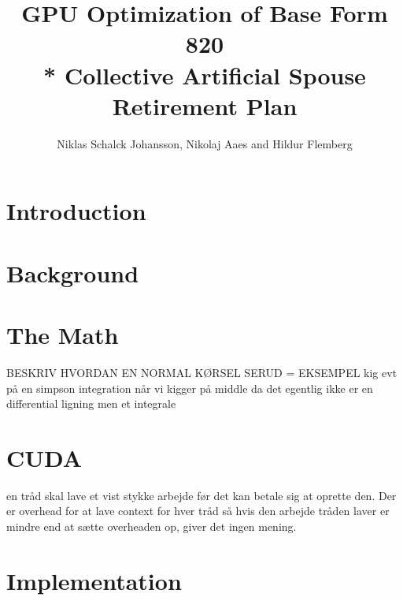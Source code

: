 \documentclass[oribibl]{llncs}
\title{GPU Optimization of Base Form 820 \\* Collective Artificial Spouse Retirement Plan}
\author{Niklas Schalck Johansson, Nikolaj Aaes and Hildur Flemberg\\
\email{\{nsjo, niaa, hufl\}@itu.dk}}
\institute{IT University of Copenhagen}
\begin{document}
	\maketitle
	
	
	\begin{abstract}
		
		\label{abstract}
	\end{abstract}
	
	\section{Introduction}
	
	
	\label{introduction}
		
	\section{Background}
		
	
	\label{background}
		
	\section{The Math}
		
	
	\label{themath}
	
	BESKRIV HVORDAN EN NORMAL KØRSEL SERUD = EKSEMPEL
	kig evt på en simpson integration når vi kigger på middle da det egentlig ikke er en differential ligning men et integrale
		
	\section{CUDA}
en tråd skal lave et vist stykke arbejde før det kan betale sig at oprette den. Der er overhead for at lave context for hver tråd så hvis den arbejde tråden laver er mindre end at sætte overheaden op, giver det ingen mening.

	
	\label{cuda}
		
	\section{Implementation}
		
\end{document}
